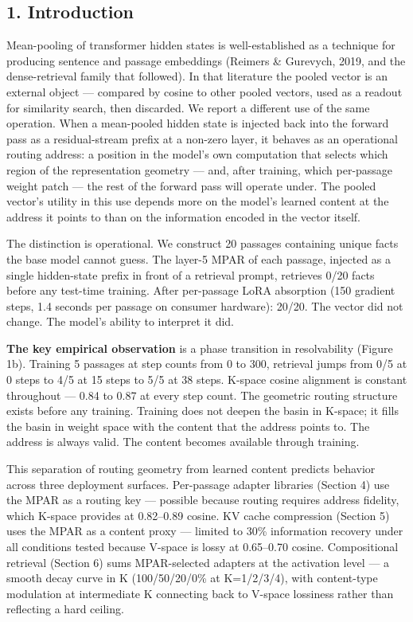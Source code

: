 \subsection{1. Introduction}\label{introduction}

Mean-pooling of transformer hidden states is well-established as a technique for producing sentence and passage embeddings (Reimers \& Gurevych, 2019, and the dense-retrieval family that followed). In that literature the pooled vector is an external object --- compared by cosine to other pooled vectors, used as a readout for similarity search, then discarded. We report a different use of the same operation. When a mean-pooled hidden state is injected back into the forward pass as a residual-stream prefix at a non-zero layer, it behaves as an operational routing address: a position in the model's own computation that selects which region of the representation geometry --- and, after training, which per-passage weight patch --- the rest of the forward pass will operate under. The pooled vector's utility in this use depends more on the model's learned content at the address it points to than on the information encoded in the vector itself.

The distinction is operational. We construct 20 passages containing unique facts the base model cannot guess. The layer-5 MPAR of each passage, injected as a single hidden-state prefix in front of a retrieval prompt, retrieves 0/20 facts before any test-time training. After per-passage LoRA absorption (150 gradient steps, 1.4 seconds per passage on consumer hardware): 20/20. The vector did not change. The model's ability to interpret it did.

\textbf{The key empirical observation} is a phase transition in resolvability (Figure 1b). Training 5 passages at step counts from 0 to 300, retrieval jumps from 0/5 at 0 steps to 4/5 at 15 steps to 5/5 at 38 steps. K-space cosine alignment is constant throughout --- 0.84 to 0.87 at every step count. The geometric routing structure exists before any training. Training does not deepen the basin in K-space; it fills the basin in weight space with the content that the address points to. The address is always valid. The content becomes available through training.

This separation of routing geometry from learned content predicts behavior across three deployment surfaces. Per-passage adapter libraries (Section 4) use the MPAR as a routing key --- possible because routing requires address fidelity, which K-space provides at 0.82--0.89 cosine. KV cache compression (Section 5) uses the MPAR as a content proxy --- limited to 30\% information recovery under all conditions tested because V-space is lossy at 0.65--0.70 cosine. Compositional retrieval (Section 6) sums MPAR-selected adapters at the activation level --- a smooth decay curve in K (100/50/20/0\% at K=1/2/3/4), with content-type modulation at intermediate K connecting back to V-space lossiness rather than reflecting a hard ceiling.


